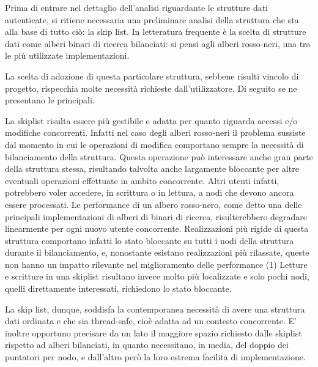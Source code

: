 %

	Prima di entrare nel dettaglio dell'analisi riguardante le strutture dati autenticate, si ritiene necessaria una preliminare analisi della struttura che sta alla base di tutto ciò: la skip list. In letteratura frequente è la scelta di strutture dati come alberi binari di ricerca bilanciati: si pensi agli alberi rosso-neri, una tra le più utilizzate implementazioni.
	
	La scelta di adozione di questa particolare struttura, sebbene risulti vincolo di progetto, rispecchia molte necessità richieste dall'utilizzatore. Di seguito se ne presentano le principali.
	
	La skiplist risulta essere più gestibile e adatta per quanto riguarda accessi e/o modifiche concorrenti. Infatti nel caso degli alberi rosso-neri il problema sussiste dal momento in cui le operazioni di modifica comportano sempre la necessità di bilanciamento della struttura. Questa operazione può interessare anche gran parte della struttura stessa, risultando talvolta anche largamente bloccante per altre eventuali operazioni effettuate in ambito concorrente. Altri utenti infatti, potrebbero voler accedere, in scrittura o in lettura, a nodi che devono ancora essere processati. Le performance di un albero rosso-nero, come detto una delle principali implementazioni di alberi di binari di ricerca, risulterebbero degradare linearmente per ogni nuovo utente concorrente. Realizzazioni più rigide di questa struttura comportano infatti lo stato bloccante su tutti i nodi della struttura durante il bilanciamento, e, nonostante esistano realizzazioni più rilassate, queste non hanno un impatto rilevante nel miglioramento delle performance (1)
	Letture e scritture in una skiplist risultano invece molto più localizzate e solo pochi nodi, quelli direttamente interessati, richiedono lo stato bloccante.
	
	La skip list, dunque, soddisfa la contemporanea necessità di avere una struttura dati ordinata e che sia thread-safe, cioè adatta ad un contesto concorrente.
	E' inoltre opportuno precisare da un lato il maggiore spazio richiesto dalle skiplist rispetto ad alberi bilanciati, in quanto necessitano, in media, del doppio dei puntatori per nodo, e dall'altro però la loro estrema facilita di implementazione.
	
